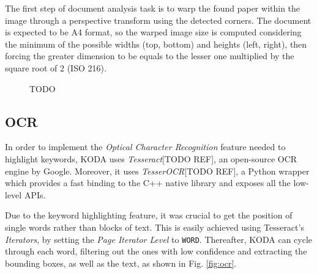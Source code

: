 \documentclass[a4paper]{article}
\begin{document}
The first step of document analysis task is to warp the found paper within the image through a perspective transform using the detected corners. The document is expected to be A4 format, so the warped image size is computed considering the minimum of the possible widths (top, bottom) and heights (left, right), then forcing the greater dimension to be equals to the lesser one multiplied by the square root of 2 (ISO 216).

\begin{figure}[H]
	\caption{TODO}
	\label{fig:warping}
\end{figure}

\subsection{OCR}

In order to implement the \textit{Optical Character Recognition} feature needed to highlight keywords, KODA uses \textit{Tesseract}[TODO REF], an open-source OCR engine by Google. Moreover, it uses \textit{TesserOCR}[TODO REF], a Python wrapper which provides a fast binding to the C++ native library and exposes all the low-level APIs.

Due to the keyword highlighting feature, it was crucial to get the position of single words rather than blocks of text. This is easily achieved using Tesseract's \textit{Iterators}, by setting the \textit{Page Iterator Level} to \texttt{WORD}. Thereafter, KODA can cycle through each word, filtering out the ones with low confidence and extracting the bounding boxes, as well as the text, as shown in Fig. \ref{fig:ocr}.
\end{document}
